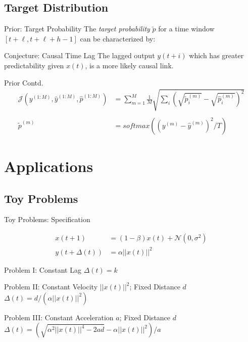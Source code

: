 \documentclass{beamer}
\begin{document}
\subsection{Target Distribution}
\begin{frame}{Prior: Target Probability}
The \textit{target probability} $\widetilde{p}$ for a time window $[t+\ell, t+\ell+h-1]$ can be characterized by:
\newline

\begin{block}{Conjecture: Causal Time Lag}
The lagged output $y(t+i)$ which has greater predictability given $x(t)$, is a more likely causal link. 
\end{block}

    
\end{frame}


\begin{frame}{Prior Contd.}
\begin{align*}
\mathcal{J}(y^{(1:M)}, \hat{y}^{(1:M)}, \hat{p}^{(1:M)}) &= \sum_{m = 1}^{M}{\frac{1}{M} \sqrt{\sum_{i}{(\sqrt{\widetilde{p}^{(m)}_i} -  \sqrt{\hat{p}^{(m)}_i})^2}}} \\\\
\widetilde{p}^{(m)} &= softmax( (y^{(m)} - \hat{y}^{(m)})^{2}/T )
\end{align*}
\end{frame}


\section{Applications}

\subsection{Toy Problems}

\begin{frame}{Toy Problems: Specification}

\begin{align*}
 x(t+1) &= (1 - \beta) x(t) + \mathcal{N}(0, \sigma^2) \\
 y(t+\Delta(t)) &= \alpha ||x(t)||^2
\end{align*}

\begin{block}{Problem I: Constant Lag}
$\Delta(t) = k$
\end{block}

\begin{block}{Problem II: Constant Velocity $||x(t)||^2$; Fixed Distance $d$}
$\Delta(t) = d/(\alpha ||x(t)||^2)$
\end{block}

\begin{block}{Problem III: Constant Acceleration $a$; Fixed Distance $d$}
$\Delta(t) = (\sqrt{\alpha^2||x(t)||^4 - 2ad} - \alpha||x(t)||^2)/a$
\end{block}

\end{frame}
\end{document}
